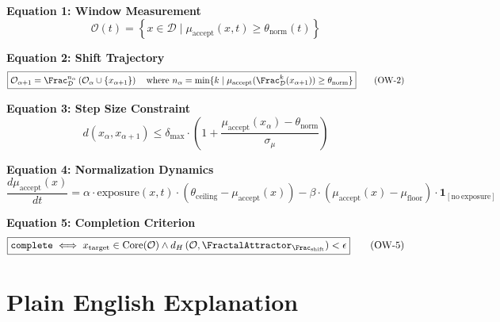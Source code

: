 \begin{tcolorbox}[colback=gray!5!white,colframe=gray!75!black,title=\textbf{Canonical Overton Window Equations},breakable]

\textbf{Equation 1: Window Measurement}
\begin{equation}
\boxed{
    \mathcal{O}(t) = \left\{ x \in \mathcal{D} \;\Big|\;
    \mu_{\mathrm{accept}}(x, t) \geq \theta_{\mathrm{norm}}(t) \right\}
}
\tag{OW-1}
\end{equation}

\textbf{Equation 2: Shift Trajectory}
\begin{equation}
\boxed{
    \mathcal{O}_{\alpha+1} = \Frac_{\mathcal{D}}^{n_\alpha}\left(
    \mathcal{O}_\alpha \cup \{x_{\alpha+1}\} \right)
    \quad \text{where } n_\alpha =
    \min\{k \mid \mu_{\mathrm{accept}}(\Frac_{\mathcal{D}}^k(x_{\alpha+1}))
    \geq \theta_{\mathrm{norm}}\}
}
\tag{OW-2}
\end{equation}

\textbf{Equation 3: Step Size Constraint}
\begin{equation}
\boxed{
    d(x_\alpha, x_{\alpha+1}) \leq \delta_{\max} \cdot
    \left(1 + \frac{\mu_{\mathrm{accept}}(x_\alpha) - \theta_{\mathrm{norm}}}
    {\sigma_{\mu}}\right)
}
\tag{OW-3}
\end{equation}

\textbf{Equation 4: Normalization Dynamics}
\begin{equation}
\boxed{
    \frac{d\mu_{\mathrm{accept}}(x)}{dt} =
    \alpha \cdot \mathrm{exposure}(x, t) \cdot
    \left( \theta_{\mathrm{ceiling}} - \mu_{\mathrm{accept}}(x) \right) -
    \beta \cdot \left( \mu_{\mathrm{accept}}(x) - \mu_{\mathrm{floor}} \right) \cdot
    \mathbf{1}_{[\mathrm{no\ exposure}]}
}
\tag{OW-4}
\end{equation}

\textbf{Equation 5: Completion Criterion}
\begin{equation}
\boxed{
    \mathtt{complete} \iff
    x_{\mathrm{target}} \in \mathrm{Core}(\mathcal{O}) \land
    d_H\left(\mathcal{O}, \FractalAttractor_{\Frac_{\mathrm{shift}}}\right) < \epsilon
}
\tag{OW-5}
\end{equation}

\end{tcolorbox}

\section{Plain English Explanation}
\label{sec:overton-plain}

